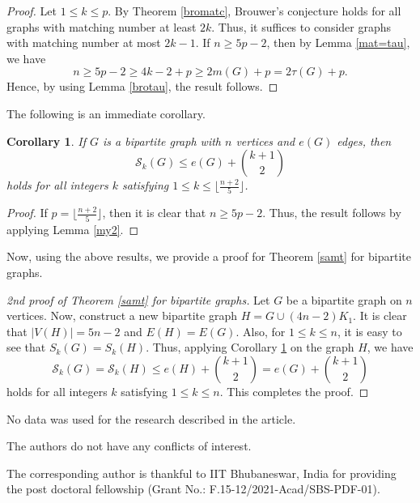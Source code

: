 \documentclass[12pt]{article}
\theoremstyle{plain}
\newtheorem{corollary}[theorem]{Corollary}
\theoremstyle{definition}
\begin{document}
\begin{proof}
Let $1\leq k\leq p$. By Theorem \ref{bromatc}, Brouwer’s conjecture holds for all graphs with matching number at least $2k$. Thus, it suffices to consider graphs with matching number at most $2k-1$. If $n\geq 5p-2$, then by Lemma \ref{mat=tau}, we have  
$$n\geq 5p-2\geq 4k-2+p\geq 2m(G)+p=2\tau(G)+p.$$  
Hence, by using Lemma \ref{brotau}, the result follows.
\end{proof}
The following is an immediate corollary.
\begin{corollary}\label{prince1}
If $G$ is a bipartite graph with $n$ vertices and $e(G)$ edges, then $$\mathcal{S}_k(G)\leq e(G)+\binom{k+1}{2}$$ holds for all integers $k$ satisfying $1\leq k\leq\lfloor \frac{n+2}{5}\rfloor$.
\end{corollary} 
\begin{proof}
If $p=\lfloor \frac{n+2}{5}\rfloor$, then it is clear that $n\geq 5p-2$. Thus, the result follows by applying Lemma \ref{my2}.
\end{proof}
Now, using the above results, we provide a proof for Theorem \ref{samt} for bipartite graphs.
\begin{proof}[2nd proof of Theorem \ref{samt} for bipartite graphs]
Let $G$ be a bipartite graph on $n$ vertices. Now, construct a new bipartite graph $H=G\cup(4n-2)K_1$. It is clear that $|V(H)|=5n-2$ and $E(H)=E(G)$. Also,  for $1\leq k\leq n$, it is easy to see that $S_k(G)=S_k(H).$ Thus, applying Corollary \ref{prince1} on the graph $H$, we have $$\mathcal{S}_k(G)=\mathcal{S}_k(H) \leq e(H)+\binom{k+1}{2}=e(G)+\binom{k+1}{2}$$ holds for all integers $k$ satisfying $1\leq k\leq n$. This completes the proof.
\end{proof}


\bigskip

\bigskip
{} No data was used for the research described in the article.

\bigskip
{} The authors do not have any conflicts of interest.

		
\bigskip
	
  The corresponding author is thankful to IIT Bhubaneswar, India for providing the post doctoral fellowship (Grant No.: F.15-12/2021-Acad/SBS-PDF-01).
	
\end{document}
